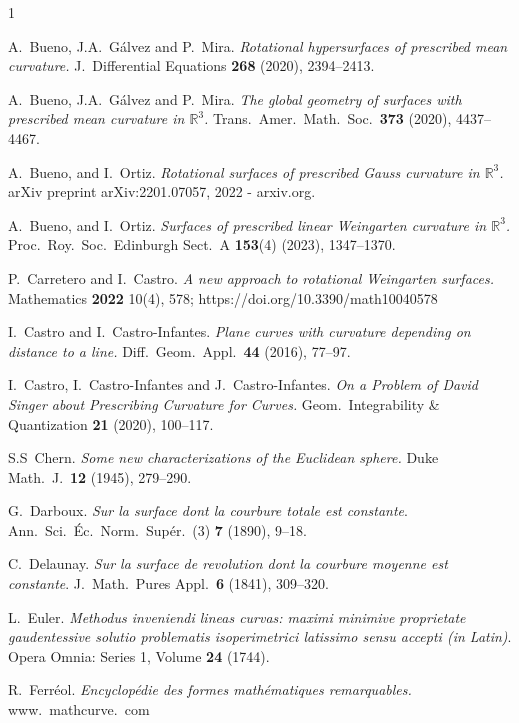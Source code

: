 \documentclass[leqno,11pt]{amsart}
\def\R{\mathbb{R}}
\theoremstyle{definition}
\numberwithin{equation}{section}
\begin{document}
\begin{thebibliography}{1}


 A.~Bueno, J.A.~G\'alvez and P.~Mira. {\em Rotational hypersurfaces of prescribed mean curvature.}  J.\ Differential Equations \textbf{268} (2020), 2394--2413.

 A.~Bueno, J.A.~G\'alvez and P.~Mira. {\em The global geometry of surfaces with prescribed mean curvature in $\R^3$.}  Trans.\ Amer.\ Math.\ Soc.\ \textbf{373} (2020), 4437--4467.

 A.~Bueno, and I.~Ortiz. {\em Rotational surfaces of prescribed Gauss curvature in $\R^3$.}   arXiv preprint arXiv:2201.07057, 2022 - arxiv.org.

 A.~Bueno, and I.~Ortiz. {\em Surfaces of prescribed linear Weingarten curvature in $\R^3$.}   Proc.\ Roy.\ Soc.\ Edinburgh Sect.\ A \textbf{153}(4) (2023), 1347--1370.

 P.~Carretero and I.~Castro. {\em A new approach to rotational Weingarten surfaces.} 
Mathematics {\bf 2022} 10(4), 578; https://doi.org/10.3390/math10040578

 I.~Castro and I.~Castro-Infantes.
{\em Plane curves with curvature depending on distance to a line.}
Diff.\ Geom.\ Appl.\ {\bf 44} (2016), 77--97.

 I.~Castro, I.~Castro-Infantes and J.~Castro-Infantes.
{\em On a Problem of David Singer about Prescribing Curvature for Curves.}
Geom.\ Integrability \& Quantization {\bf 21} (2020), 100--117.

 S.S~Chern.
{\em Some new characterizations of the Euclidean sphere.}
Duke Math.\ J.\ {\bf 12} (1945), 279--290.

 G.~Darboux.
{\em Sur la surface dont la courbure totale est constante}.
Ann.\ Sci.\ \'Ec.\ Norm.\ Sup\'er.\ (3) {\bf 7} (1890), 9--18.

 C.~Delaunay.
{\em Sur la surface de revolution dont la courbure moyenne est constante}.
J.\ Math.\ Pures Appl.\ {\bf 6} (1841), 309--320.

 L.~Euler.
{\em Methodus inveniendi lineas curvas: maximi minimive proprietate gaudentessive solutio problematis isoperimetrici latissimo sensu accepti (in Latin)}. 
Opera Omnia: Series 1, Volume \textbf{24} (1744).

 R.~Ferr\'{e}ol.
{\em Encyclop\'{e}die des formes math\'{e}matiques remarquables.}
www.\ mathcurve.\ com


\end{thebibliography}
\end{document}
